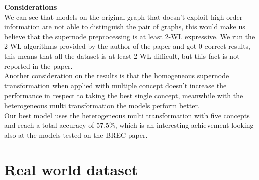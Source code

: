 \documentclass[twoside,11pt]{article}
\begin{document}
\noindent
\textbf{Considerations}\\
We can see that models on the original graph that doesn't exploit high order information are not able to distinguish the pair of graphs, this would make us believe that the supernode preprocessing is at least 2-WL expressive. We run the 2-WL algorithms provided by the author of the paper and got 0 correct results, this means that all the dataset is at least 2-WL difficult, but this fact is not reported in the paper.\\
Another consideration on the results is that the homogeneous supernode transformation when applied with multiple concept doesn't increase the performance in respect to taking the best single concept, meanwhile with the heterogeneous multi transformation the models perform better.\\
Our best model uses the heterogeneous multi transformation with five concepts and reach a total accuracy of 57.5\%, which is an interesting achievement looking also at the models tested on the BREC paper.




\section{Real world dataset} %
\label{sec:real_world_dataset}




\end{document}
